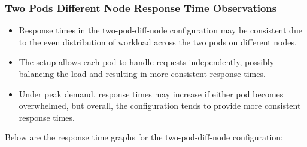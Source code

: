 \subsubsection{Two Pods Different Node Response Time Observations}
\begin{itemize}
    \item Response times in the two-pod-diff-node configuration may be consistent due to the even distribution of workload across the two pods on different nodes.
    \item The setup allows each pod to handle requests independently, possibly balancing the load and resulting in more consistent response times.
    \item Under peak demand, response times may increase if either pod becomes overwhelmed, but overall, the configuration tends to provide more consistent response times.
\end{itemize}

\noindent Below are the response time graphs for the two-pod-diff-node configuration:

